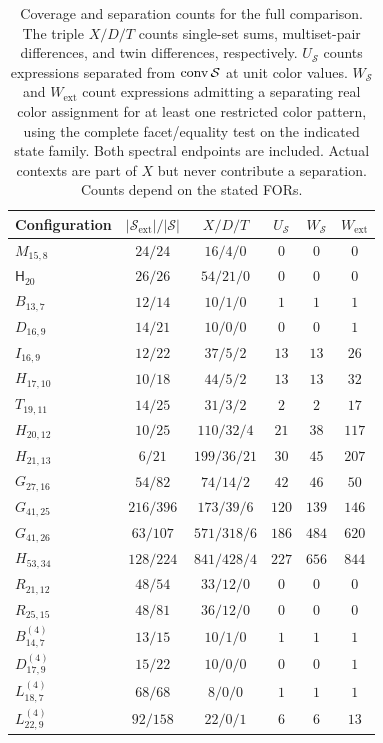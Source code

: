 \documentclass[aps,pra,reprint,superscriptaddress,longbibliography,nofootinbib,floatfix,10pt]{revtex4-2}
\theoremstyle{definition}\newtheorem{definition}[theorem]{Definition}
\theoremstyle{remark}\newtheorem{remark}[theorem]{Remark}
\newcommand{\Sc}{\mathcal S}\newcommand{\Cc}{\mathcal C}\newcommand{\Wc}{\mathcal W}
\begin{document}
\begin{table}[t]
\caption{Coverage and separation counts for the full comparison. The triple $X/D/T$ counts single-set sums, multiset-pair differences, and twin differences, respectively. $U_{\Sc}$ counts expressions separated from $\conv\Sc$ at unit color values. $W_{\Sc}$ and $W_{\mathrm{ext}}$ count expressions admitting a separating real color assignment for at least one restricted color pattern, using the complete facet/equality test on the indicated state family. Both spectral endpoints are included. Actual contexts are part of $X$ but never contribute a separation. Counts depend on the stated FORs.}\label{tab:classical-quantum-coverage}
\footnotesize\renewcommand{\arraystretch}{1.35}\setlength{\tabcolsep}{10pt}
\begin{ruledtabular}
\begin{tabular}{lccccc}
Configuration & $|\Sc_{\mathrm{ext}}|/|\Sc|$ & $X/D/T$ & $U_{\Sc}$ & $W_{\Sc}$ & $W_{\mathrm{ext}}$\\\hline
$M_{15,8}$ & $24/24$ & $16/4/0$ & $0$ & $0$ & $0$\\
$\mathsf H_{20}$ & $26/26$ & $54/21/0$ & $0$ & $0$ & $0$\\
$B_{13,7}$ & $12/14$ & $10/1/0$ & $1$ & $1$ & $1$\\
$D_{16,9}$ & $14/21$ & $10/0/0$ & $0$ & $0$ & $1$\\
$I_{16,9}$ & $12/22$ & $37/5/2$ & $13$ & $13$ & $26$\\
$H_{17,10}$ & $10/18$ & $44/5/2$ & $13$ & $13$ & $32$\\
$T_{19,11}$ & $14/25$ & $31/3/2$ & $2$ & $2$ & $17$\\
$H_{20,12}$ & $10/25$ & $110/32/4$ & $21$ & $38$ & $117$\\
$H_{21,13}$ & $6/21$ & $199/36/21$ & $30$ & $45$ & $207$\\
$G_{27,16}$ & $54/82$ & $74/14/2$ & $42$ & $46$ & $50$\\
$G_{41,25}$ & $216/396$ & $173/39/6$ & $120$ & $139$ & $146$\\
$G_{41,26}$ & $63/107$ & $571/318/6$ & $186$ & $484$ & $620$\\
$H_{53,34}$ & $128/224$ & $841/428/4$ & $227$ & $656$ & $844$\\
$R_{21,12}$ & $48/54$ & $33/12/0$ & $0$ & $0$ & $0$\\
$R_{25,15}$ & $48/81$ & $36/12/0$ & $0$ & $0$ & $0$\\
$B_{14,7}^{(4)}$ & $13/15$ & $10/1/0$ & $1$ & $1$ & $1$\\
$D_{17,9}^{(4)}$ & $15/22$ & $10/0/0$ & $0$ & $0$ & $1$\\
$L_{18,7}^{(4)}$ & $68/68$ & $8/0/0$ & $1$ & $1$ & $1$\\
$L_{22,9}^{(4)}$ & $92/158$ & $22/0/1$ & $6$ & $6$ & $13$\\

\end{tabular}
\end{ruledtabular}
\end{table}
\end{document}
